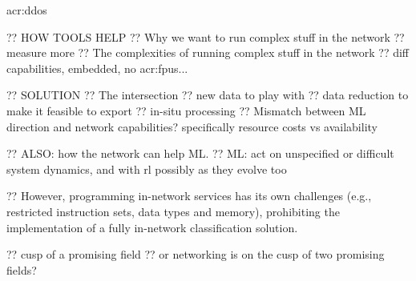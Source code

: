 \gls{acr:ddos}


?? HOW TOOLS HELP
?? Why we want to run complex stuff in the network
?? measure more
?? The complexities of running complex stuff in the network
?? diff capabilities, embedded, no \glspl{acr:fpu}...

?? SOLUTION
?? The intersection
?? new data to play with
?? data reduction to make it feasible to export
?? in-situ processing
?? Mismatch between ML direction and network capabilities? specifically resource costs vs availability

?? ALSO: how the network can help ML.
?? ML: act on unspecified or difficult system dynamics, and with rl possibly as they evolve too

?? However, programming in-network services has its own challenges (e.g., restricted instruction sets, data types and memory), prohibiting the implementation of a fully in-network classification solution.

?? cusp of a promising field
?? or networking is on the cusp of two promising fields?

